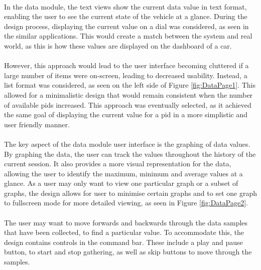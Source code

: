 		\paragraph{}{
		In the data module, the text views show the current data value in text format, enabling the user to see the current state of the vehicle at a glance. During the design process, displaying the current value on a dial was considered, as seen in the similar applications. This would create a match between the system and real world, as this is how these values are displayed on the dashboard of a car.
		}
		\paragraph{}{
		However, this approach would lead to the user interface becoming cluttered if a large number of items were on-screen, leading to decreased usability. Instead, a list format was considered, as seen on the left side of Figure \ref{fig:DataPage1}. This allowed for a minimalistic design that would remain consistent when the number of available pids increased. This approach was eventually selected, as it achieved the same goal of displaying the current value for a pid in a more simplistic and user friendly manner.
		}
		\paragraph{}{
		The key aspect of the data module user interface is the graphing of data values. By graphing the data, the user can track the values throughout the history of the current session. It also provides a more visual representation for the data, allowing the user to identify the maximum, minimum and average values at a glance. As a user may only want to view one particular graph or a subset of graphs, the design allows for user to minimise certain graphs and to set one graph to fullscreen mode for more detailed viewing, as seen in Figure \ref{fig:DataPage2}.
		}
		\paragraph{}{
		The user may want to move forwards and backwards through the data samples that have been collected, to find a particular value. To accommodate this, the design contains controls in the command bar. These include a play and pause button, to start and stop gathering, as well as skip buttons to move through the samples.
		}
		
